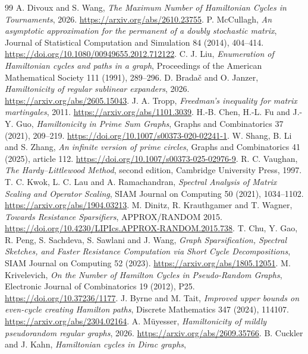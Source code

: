 \documentclass[11pt]{article}
\theoremstyle{remark}
\begin{document}
\begin{thebibliography}{99}
A. Divoux and S. Wang,
\emph{The Maximum Number of Hamiltonian Cycles in Tournaments},
2026. \url{https://arxiv.org/abs/2610.23755}.
P. McCullagh,
\emph{An asymptotic approximation for the permanent of a doubly
stochastic matrix},
Journal of Statistical Computation and Simulation 84 (2014), 404--414.
\url{https://doi.org/10.1080/00949655.2012.712122}.
C. J. Liu,
\emph{Enumeration of Hamiltonian cycles and paths in a graph},
Proceedings of the American Mathematical Society 111 (1991), 289--296.
D. Brada\v{c} and O. Janzer,
\emph{Hamiltonicity of regular sublinear expanders},
2026. \url{https://arxiv.org/abs/2605.15043}.
J. A. Tropp, \emph{Freedman's inequality for matrix martingales},
2011. \url{https://arxiv.org/abs/1101.3039}.
H.-B. Chen, H.-L. Fu and J.-Y. Guo,
\emph{Hamiltonicity in Prime Sum Graphs},
Graphs and Combinatorics 37 (2021), 209--219.
\url{https://doi.org/10.1007/s00373-020-02241-1}.
W. Shang, B. Li and S. Zhang,
\emph{An infinite version of prime circles},
Graphs and Combinatorics 41 (2025), article 112.
\url{https://doi.org/10.1007/s00373-025-02976-9}.
R. C. Vaughan, \emph{The Hardy--Littlewood Method},
second edition, Cambridge University Press, 1997.
T. C. Kwok, L. C. Lau and A. Ramachandran,
\emph{Spectral Analysis of Matrix Scaling and Operator Scaling},
SIAM Journal on Computing 50 (2021), 1034--1102.
\url{https://arxiv.org/abs/1904.03213}.
M. Dinitz, R. Krauthgamer and T. Wagner,
\emph{Towards Resistance Sparsifiers}, APPROX/RANDOM 2015.
\url{https://doi.org/10.4230/LIPIcs.APPROX-RANDOM.2015.738}.
T. Chu, Y. Gao, R. Peng, S. Sachdeva, S. Sawlani and J. Wang,
\emph{Graph Sparsification, Spectral Sketches, and Faster
Resistance Computation via Short Cycle Decompositions},
SIAM Journal on Computing 52 (2023).
\url{https://arxiv.org/abs/1805.12051}.
M. Krivelevich,
\emph{On the Number of Hamilton Cycles in Pseudo-Random Graphs},
Electronic Journal of Combinatorics 19 (2012), P25.
\url{https://doi.org/10.37236/1177}.
J. Byrne and M. Tait,
\emph{Improved upper bounds on even-cycle creating Hamilton paths},
Discrete Mathematics 347 (2024), 114107.
\url{https://arxiv.org/abs/2304.02164}.
A. M\"uyesser,
\emph{Hamiltonicity of mildly pseudorandom regular graphs},
2026. \url{https://arxiv.org/abs/2609.35766}.
B. Cuckler and J. Kahn, \emph{Hamiltonian cycles in Dirac graphs},

\end{thebibliography}
\end{document}
